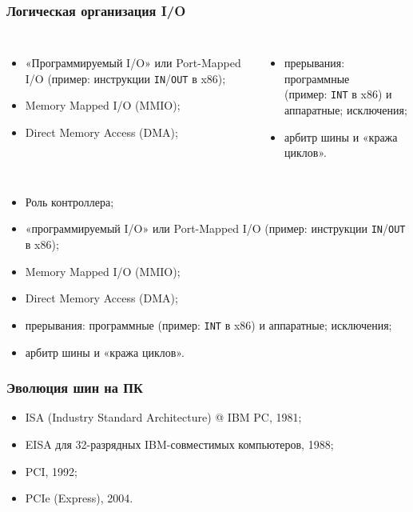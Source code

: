 \begin{frame}
\frametitle{Логическая организация I/O}

\pause
\small
\begin{columns}
    \column{6cm}
\begin{itemize}[<+->]
    \item «Программируемый I/O» или Port-Mapped I/O (пример: инструкции \texttt{IN}/\texttt{OUT} в x86);
    \item Memory Mapped I/O (MMIO);
    \item Direct Memory Access (DMA);
\end{itemize}

    \column{6.5cm}
\begin{itemize}[<+->]
    \item прерывания: программные\\(пример: \texttt{INT} в x86) и аппаратные; исключения;
    \item арбитр шины и «кража циклов».
\end{itemize}
\end{columns}

\begin{itemize}[<+->]
    \item Роль контроллера;
    \item «программируемый I/O» или Port-Mapped I/O (пример: инструкции \texttt{IN}/\texttt{OUT} в x86);
    \item Memory Mapped I/O (MMIO);
    \item Direct Memory Access (DMA);
    \item прерывания: программные (пример: \texttt{INT} в x86) и аппаратные; исключения;
    \item арбитр шины и «кража циклов».
\end{itemize}
\end{frame}

\begin{frame}
\frametitle{Эволюция шин на ПК}
\begin{itemize}
    \item ISA (Industry Standard Architecture) @ IBM PC, 1981;
    \item EISA для 32-разрядных IBM-совместимых компьютеров, 1988;
    \item PCI, 1992;
    \item PCIe (Express), 2004.
\end{itemize}
\end{frame}

